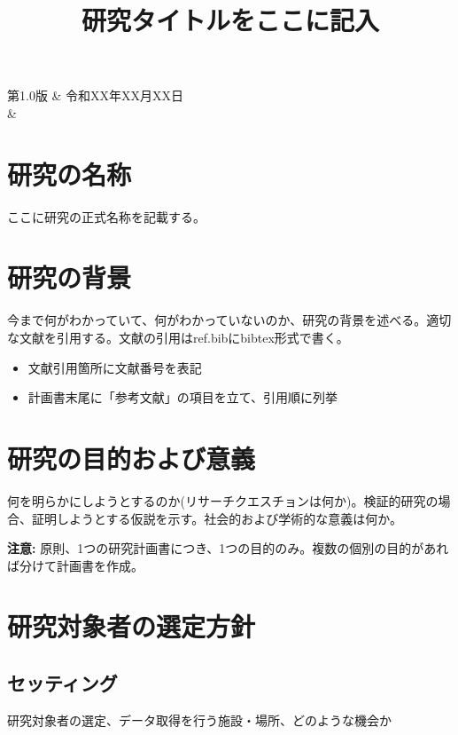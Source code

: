 \documentclass{kyodai-protocol}
\title{研究タイトルをここに記入}
\begin{document}
\maketitle

\begin{revisionhistory}
第1.0版 & 令和XX年XX月XX日 \\ \hline
 & \\ \hline
\end{revisionhistory}

\tableofcontents

\section{研究の名称}
\label{sec:title}

ここに研究の正式名称を記載する。

\section{研究の背景}
\label{sec:background}

今まで何がわかっていて、何がわかっていないのか、研究の背景を述べる。適切な文献を引用する。文献の引用はref.bibにbibtex形式で書く。

\begin{itemize}
\item 文献引用箇所に文献番号を表記
\item 計画書末尾に「参考文献」の項目を立て、引用順に列挙
\end{itemize}

\section{研究の目的および意義}
\label{sec:objectives}

何を明らかにしようとするのか(リサーチクエスチョンは何か)。検証的研究の場合、証明しようとする仮説を示す。社会的および学術的な意義は何か。

\textbf{注意:} 原則、1つの研究計画書につき、1つの目的のみ。複数の個別の目的があれば分けて計画書を作成。

\section{研究対象者の選定方針}
\label{sec:subjects}

\subsection{セッティング}
研究対象者の選定、データ取得を行う施設・場所、どのような機会か
\end{document}
